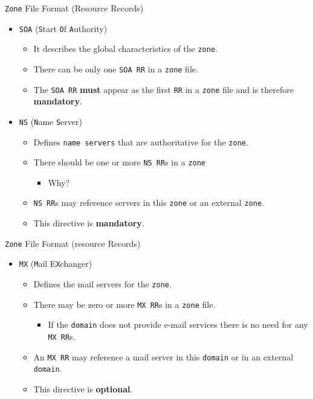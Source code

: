 \documentclass[aspectratio=169,xcolor=table]{beamer}
\begin{document}
\begin{frame}{\texttt{Zone} File Format (Resource Records)}
  \begin{itemize}
    \item \texttt{SOA} (\texttt{S}tart \texttt{O}f \texttt{A}uthority)
       \begin{itemize}
         \item It describes the global characteristics of the \texttt{zone}.
         \item There can be only one \texttt{SOA RR} in a \texttt{zone} file. 
         \item The \texttt{SOA RR} \textbf{must} appear as the first \texttt{RR} in a \texttt{zone} file and is therefore \textbf{mandatory}.
       \end{itemize}
     \item \texttt{NS} (\texttt{N}ame \texttt{S}erver)
       \begin{itemize}
         \item Defines \texttt{name servers} that are authoritative for the \texttt{zone}. 
         \item There should be one or more \texttt{NS RR}s in a \texttt{zone} 
           \begin{itemize}
             \item Why?
           \end{itemize} 
         \item \texttt{NS RR}s may reference servers in this \texttt{zone} or an external \texttt{zone}. 
         \item This directive is \textbf{mandatory}.
       \end{itemize}
  \end{itemize}
\end{frame}

\begin{frame}{\texttt{Zone} File Format (resource Records)}
  \begin{itemize}
    \item \texttt{MX} (\texttt{M}ail E\texttt{X}changer)
       \begin{itemize}
          \item Defines the mail servers for the \texttt{zone}. 
          \item There may be zero or more \texttt{MX RR}s in a \texttt{zone} file.
            \begin{itemize}
              \item If the \texttt{domain} does not provide e-mail services there is no need for any \texttt{MX RR}s.
            \end{itemize} 
         \item An \texttt{MX RR} may reference a mail server in this \texttt{domain} or in an external \texttt{domain}. 
         \item This directive is \textbf{optional}.
       \end{itemize}
  \end{itemize}
\end{frame}
\end{document}
